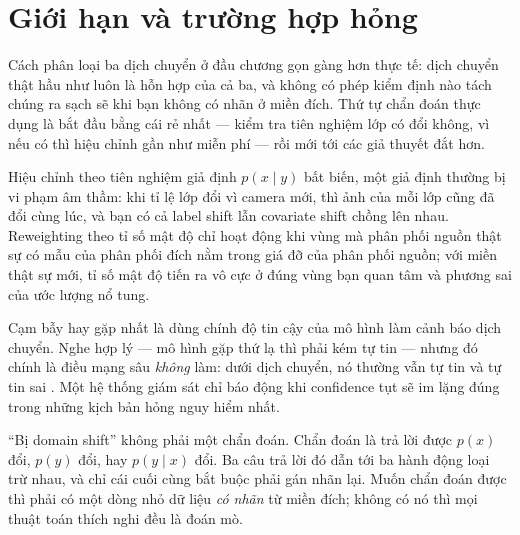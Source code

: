 \documentclass[../../deep_learning.tex]{subfiles}
\begin{document}
\section{Giới hạn và trường hợp hỏng}
Cách phân loại ba dịch chuyển ở đầu chương gọn gàng hơn thực tế: dịch chuyển thật hầu như luôn là hỗn hợp của cả ba, và không có phép kiểm định nào tách chúng ra sạch sẽ khi bạn không có nhãn ở miền đích. Thứ tự chẩn đoán thực dụng là bắt đầu bằng cái rẻ nhất --- kiểm tra tiên nghiệm lớp có đổi không, vì nếu có thì hiệu chỉnh gần như miễn phí --- rồi mới tới các giả thuyết đắt hơn.

Hiệu chỉnh theo tiên nghiệm giả định \(p(x \mid y)\) bất biến, một giả định thường bị vi phạm âm thầm: khi tỉ lệ lớp đổi vì camera mới, thì ảnh của mỗi lớp cũng đã đổi cùng lúc, và bạn có cả label shift lẫn covariate shift chồng lên nhau. Reweighting theo tỉ số mật độ chỉ hoạt động khi vùng mà phân phối nguồn thật sự có mẫu của phân phối đích nằm trong giá đỡ của phân phối nguồn; với miền thật sự mới, tỉ số mật độ tiến ra vô cực ở đúng vùng bạn quan tâm và phương sai của ước lượng nổ tung.

\begin{cambay}
Cạm bẫy hay gặp nhất là dùng chính độ tin cậy của mô hình làm cảnh báo dịch chuyển. Nghe hợp lý --- mô hình gặp thứ lạ thì phải kém tự tin --- nhưng đó chính là điều mạng sâu \emph{không} làm: dưới dịch chuyển, nó thường vẫn tự tin và tự tin sai \cite{ovadia2019can}. Một hệ thống giám sát chỉ báo động khi confidence tụt sẽ im lặng đúng trong những kịch bản hỏng nguy hiểm nhất.
\end{cambay}

\begin{cannho}
``Bị domain shift'' không phải một chẩn đoán. Chẩn đoán là trả lời được \(p(x)\) đổi, \(p(y)\) đổi, hay \(p(y \mid x)\) đổi. Ba câu trả lời đó dẫn tới ba hành động loại trừ nhau, và chỉ cái cuối cùng bắt buộc phải gán nhãn lại. Muốn chẩn đoán được thì phải có một dòng nhỏ dữ liệu \emph{có nhãn} từ miền đích; không có nó thì mọi thuật toán thích nghi đều là đoán mò. 
\end{cannho}
\end{document}
